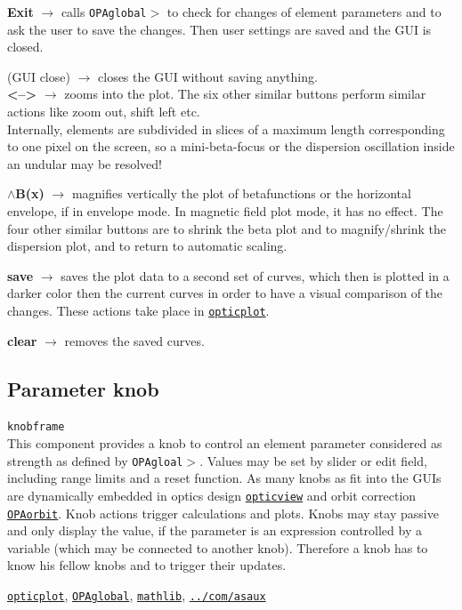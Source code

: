 \documentclass[12pt]{article}
\newcommand\code[1]{{\tt #1}}
\newcommand{\ofld}[1]{\colorbox{black!15}{{\bf #1}}}
\newcommand{\ofldx}[1]{\colorbox{black!15}{(#1)}}
\newcommand\guico[1]{{\color{blue}\code{#1}}}
\newcommand{\unico}[1]{{\color{burntorange}\code{#1}}}
\newcommand{\evcod}[2]{\ofld{#1} $\rightarrow$ \guico{#2}}
\newcommand{\evcodx}[2]{\ofldx{#1} $\rightarrow$ \guico{#2}}
\newcommand{\prcod}[2]{\opauni{#1}$>$\unico{#2}}
\newcommand{\opagui}[1]{\colorbox{blue!20}{\code{#1}}}
\newcommand{\ogui}[1]{\hyperref[#1]{\opagui{#1}}}
\newcommand{\opaguif}[1]{\colorbox{violet!30}{\code{#1}}}
\newcommand{\oguifh}[2]{\subsection{\label{#2}#1}{\Huge\opaguif{#2}}\\}
\newcommand{\opauni}[1]{\colorbox{orange!30}{\code{#1}}}
\newcommand{\ouni}[1]{\hyperref[#1]{\opauni{#1}}}
\newcommand{\uses}[1]{\flushleft {\bf Uses:} #1}
\newcommand{\desc}[1]{#1}
\newcommand{\feature}[1]{{\color{cadmiumgreen} #1}}
\begin{document}
{\evcod{Exit}{butexitClick} calls \prcod{OPAglobal}{EllaSave} to check for changes of element parameters and to ask the user to save the changes. Then user settings are saved and the GUI is closed.

\evcodx{GUI close}{FormClose} closes the GUI without saving anything.\\

\evcod{\textless--\textgreater}{buzoominClick} zooms into the plot. The six other similar buttons perform similar actions like zoom out, shift left etc.\\ \feature{Internally, elements are subdivided in slices of a maximum length corresponding to one pixel on the screen, so a mini-beta-focus or the dispersion oscillation inside an undular may be resolved!}

\evcod{$\wedge$B(x)}{buyupClick} magnifies vertically the plot of betafunctions or the horizontal envelope, if in envelope mode. In magnetic field plot mode, it has no effect. The four other similar buttons are to shrink the beta plot and to magnify/shrink  the dispersion plot, and to return to automatic scaling.

\evcod{save}{bucsaveClick} saves the plot data to a second set of curves, which then is plotted in a darker color then the current curves in order to have a visual comparison of the changes. These actions take place in \ouni{opticplot}.

\evcod{clear}{bucclearClick} removes the saved curves.

}




\oguifh{Parameter knob}{knobframe} 

\desc{This component provides a knob to control an element parameter considered as strength as defined by \prcod{OPAgloal}{putkval/getkval}. Values may be set by slider or edit field, including range limits and a reset function. As many knobs as fit into the GUIs are dynamically embedded in optics design \ogui{opticview} and orbit correction \ogui{OPAorbit}. Knob actions trigger calculations and plots. Knobs may stay passive and only display the value, if the parameter is an expression controlled by a variable (which may be connected to another knob). Therefore a knob has to know his fellow knobs and to trigger their updates.}

\uses{\ouni{opticplot}, \ouni{OPAglobal}, \ouni{mathlib}, \ouni{../com/asaux}} 
 
\end{document}
